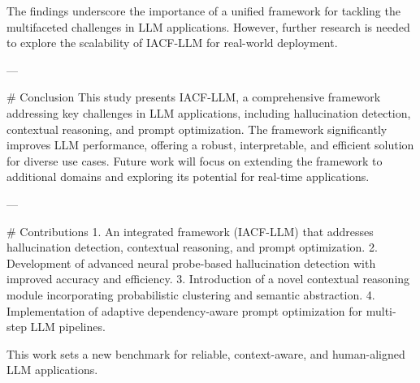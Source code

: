 The findings underscore the importance of a unified framework for tackling the multifaceted challenges in LLM applications. However, further research is needed to explore the scalability of IACF-LLM for real-world deployment.

---

# Conclusion  
This study presents IACF-LLM, a comprehensive framework addressing key challenges in LLM applications, including hallucination detection, contextual reasoning, and prompt optimization. The framework significantly improves LLM performance, offering a robust, interpretable, and efficient solution for diverse use cases. Future work will focus on extending the framework to additional domains and exploring its potential for real-time applications.

---

# Contributions  
1. An integrated framework (IACF-LLM) that addresses hallucination detection, contextual reasoning, and prompt optimization.  
2. Development of advanced neural probe-based hallucination detection with improved accuracy and efficiency.  
3. Introduction of a novel contextual reasoning module incorporating probabilistic clustering and semantic abstraction.  
4. Implementation of adaptive dependency-aware prompt optimization for multi-step LLM pipelines.  

This work sets a new benchmark for reliable, context-aware, and human-aligned LLM applications.